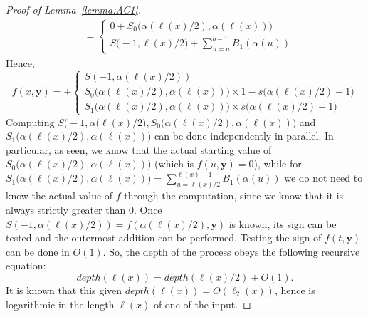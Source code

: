 \documentclass[11pt, oneside]{article}
\newcommand{\tu}[1]{\mathbf{#1}}
\theoremstyle{definition}
\begin{document}
\begin{toappendix}
\begin{proof}[Proof of Lemma~\ref{lemma:AC1}]
\begin{align*}
        &= \begin{cases}
            0 + S_0\big(\alpha(\ell(x)/2), \alpha(\ell(x))\big) \\
            S\big(-1, \ell(x)/2\big) + \sum^{b-1}_{u=a} B_1(\alpha(u))
        \end{cases}
    \end{align*}
    Hence,
    $$
        f(x, \tu y) = + \begin{cases}
            S(-1, \alpha(\ell(x)/2)) \\
            S_0\big(\alpha(\ell(x)/2), \alpha(\ell(x))\big) \times 1- s\big(\alpha(\ell(x)/2)-1\big) \\
            S_1\big(\alpha(\ell(x)/2), \alpha(\ell(x))\big) \times s\big(\alpha(\ell(x)/2)-1\big)
        \end{cases}
    $$
    Computing $S\big(-1, \alpha(\ell(x)/2\big), S_0\big(\alpha(\ell(x)/2), \alpha(\ell(x))\big)$ and $S_1\big(\alpha(\ell(x)/2), \alpha(\ell(x))\big)$ can be done independently in parallel.
    In particular, as seen, we know that the actual starting value of $S_0\big(\alpha(\ell(x)/2), \alpha(\ell(x))\big)$ (which is $f(u, \tu y)=0$), while for $S_1\big(\alpha(\ell(x)/2), \alpha(\ell(x))\big)=\sum^{\ell(x)-1}_{u=\ell(x)/2}B_1(\alpha(u))$ we do not need to know the actual value of $f$ through the computation, since we know that it is always strictly greater than 0.
    Once $S(-1, \alpha(\ell(x)/2))=f(\alpha(\ell(x)/2), \tu y)$ is known, its sign can be tested and the outermost addition can be performed. 
    Testing the sign of $f(t, \tu y)$ can be done in $O(1)$.
    So, the depth of the process obeys the following recursive equation:
    $$
    depth(\ell(x)) = depth(\ell(x)/2) + O(1).
    $$
    It is known that this given $depth(\ell(x))=O(\ell_2(x))$, hence is logarithmic in the length $\ell(x)$ of one of the input.
\end{proof}
    
\end{toappendix}
\end{document}
